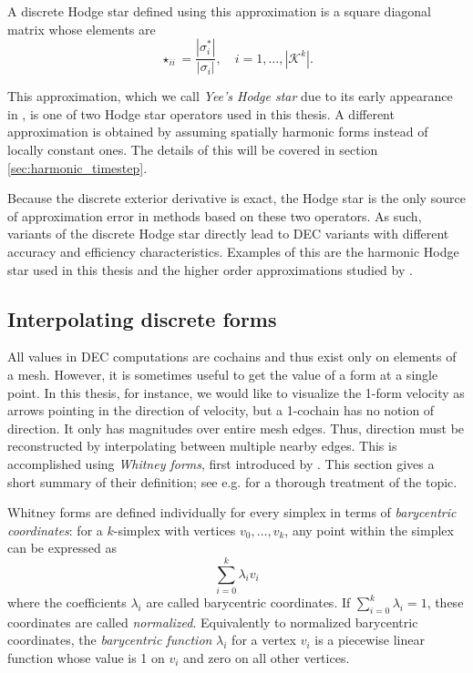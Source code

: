 \documentclass[utf8,english]{gradu3}
\begin{document}
A discrete Hodge star defined using this approximation
is a square diagonal matrix whose elements are
\begin{equation}
  \star_{ii} = \frac{|\sigma_i^*|}{|\sigma_i|}, \quad i = 1, \dots, |\mathcal{K}^k|.
\end{equation}

This approximation, which we call \textit{Yee's Hodge star}
due to its early appearance in \textcite{yee_numerical_1966},
is one of two Hodge star operators used in this thesis.
A different approximation is obtained by assuming spatially harmonic forms
instead of locally constant ones.
The details of this will be covered in section \ref{sec:harmonic_timestep}.

Because the discrete exterior derivative is exact,
the Hodge star is the only source of approximation error
in methods based on these two operators.
As such, variants of the discrete Hodge star directly lead to
DEC variants with different accuracy and efficiency characteristics.
Examples of this are the harmonic Hodge star used in this thesis
and the higher order approximations studied by \textcite{lohi_higher_2023}.

\subsection{Interpolating discrete forms}\label{sec:interpolation}

All values in DEC computations are cochains
and thus exist only on elements of a mesh.
However, it is sometimes useful to get the value of a form at a single point.
In this thesis, for instance, we would like to visualize
the 1-form velocity as arrows pointing in the direction of velocity,
but a 1-cochain has no notion of direction.
It only has magnitudes over entire mesh edges.
Thus, direction must be reconstructed by interpolating between multiple nearby edges.
This is accomplished using \textit{Whitney forms},
first introduced by \textcite{whitney_geometric_1957}.
This section gives a short summary of their definition;
see e.g. \textcite{lohi_whitney_2021} for a thorough treatment of the topic.

Whitney forms are defined individually for every simplex
in terms of \textit{barycentric coordinates}:
for a $k$-simplex with vertices $v_0, \dots, v_k$,
any point within the simplex can be expressed as
\[
  \sum_{i=0}^k \lambda_i v_i
\]
where the coefficients $\lambda_i$ are called barycentric coordinates.
If $\sum_{i=0}^k \lambda_i = 1$, these coordinates are called \textit{normalized}.
Equivalently to normalized barycentric coordinates,
the \textit{barycentric function} $\lambda_i$ for a vertex $v_i$
is a piecewise linear function whose value is 1 on $v_i$
and zero on all other vertices.
\end{document}
